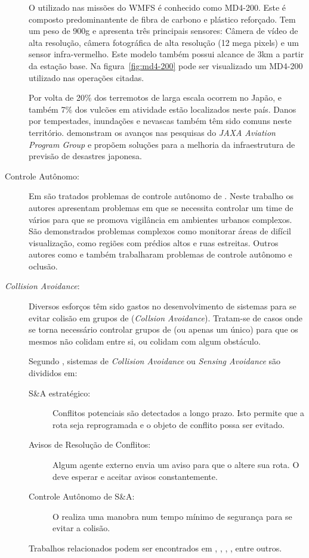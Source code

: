 \begin{description}
O \vant utilizado nas missões do WMFS é conhecido como MD4-200. Este \vant é composto predominantente de fibra de carbono e plástico reforçado. Tem um peso de 900g e apresenta três principais sensores: Câmera de vídeo de alta resolução, câmera fotográfica de alta resolução (12 mega pixels) e um sensor infra-vermelho. Este modelo também possui alcance de 3km a partir da estação base. Na figura~\ref{fig:md4-200} pode ser visualizado um MD4-200 utilizado nas operações citadas.

Por volta de 20\% dos terremotos de larga escala ocorrem no Japão, e também 7\% dos vulcões em atividade estão localizados neste país. Danos por tempestades, inundações e nevascas também têm sido comuns neste território. \cite{Sasa2008} demonstram os avanços nas pesquisas do \emph{JAXA Aviation Program Group} e propõem soluções para a melhoria da infraestrutura de previsão de desastres japonesa.

\item[Controle Autônomo: ]
Em \cite{Semsch2009} são tratados problemas de controle autônomo de \vants. Neste trabalho os autores apresentam problemas em que se necessita controlar um time de vários \vants para que se promova vigilância em ambientes urbanos complexos. São demonstrados problemas complexos como monitorar áreas de difícil visualização, como regiões com prédios altos e ruas estreitas. Outros autores como \cite{KimAndKim} e \cite{Sarmiento2004} também trabalharam problemas de controle autônomo e oclusão.

\item[ \emph{Collision Avoidance}:]
Diversos esforços têm sido gastos no desenvolvimento de sistemas para se evitar colisão em grupos de \vants (\emph{Collsion Avoidance}). Tratam-se de casos onde se torna necessário controlar grupos de \vants (ou apenas um único) para que os mesmos não colidam entre si, ou colidam com algum obstáculo.

Segundo \cite{Hutchings2007}, sistemas de \emph{Collision Avoidance} ou \emph{Sensing Avoidance} são divididos em:
	\begin{description}
		\item[S\&A estratégico: ]  Conflitos potenciais são detectados a longo prazo. Isto permite que a rota seja reprogramada e o objeto de conflito possa ser evitado.
		\item[Avisos de Resolução de Conflitos: ] Algum agente externo envia um aviso para que o \vant altere sua rota. O \vant deve esperar e aceitar avisos constantemente.
		\item[Controle Autônomo de S\&A: ] O \vant realiza uma manobra num tempo mínimo de segurança para se evitar a colisão.
	\end{description}

Trabalhos relacionados podem ser encontrados em \cite{Hutchings2007}, \cite{Bryner2007}, \cite{Deschenes2004}, \cite{Taylor2005}, entre outros.

\end{description}

